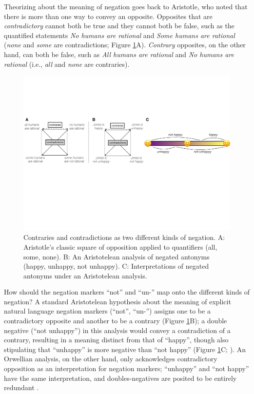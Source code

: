 \documentclass[floatsintext,doc]{apa6}
\begin{document}
Theorizing about the meaning of negation goes back to Aristotle, who noted that there is more than one way to convey an opposite.
Opposites that are \emph{contradictory} cannot both be true and they cannot both be false, such as the quantified statements \emph{No humans are rational} and \emph{Some humans are rational}  (\emph{none} and \emph{some} are contradictions; Figure \ref{fig:opp-square}A). 
\emph{Contrary} opposites, on the other hand, can both be false, such as \emph{All humans are rational} and \emph{No humans are rational} (i.e., \emph{all} and \emph{none} are contraries). 


\begin{figure}[t]
\center \includegraphics[width=1\textwidth]{figs/opp-square2}  
\caption{Contraries and contradictions as two different kinds of negation. A: Aristotle's classic square of opposition applied to quantifiers (all, some, none). B: An Aristotelean analysis of negated antonyms (happy, unhappy, not unhappy). C: Interpretations of negated antonyms under an Aristotelean analysis.}\label{fig:opp-square}
\end{figure}

How should the negation markers ``not'' and ``un-'' map onto the different kinds of negation?
A standard Aristotelean hypothesis about the meaning of explicit natural language negation markers (\enquote{not}, \enquote{un-}) assigns one to be a contradictory opposite and another to be a contrary (Figure \ref{fig:opp-square}B); a double negative (``not unhappy'') in this analysis would convey a contradiction of a contrary, resulting in a meaning distinct from that of ``happy'', though also stipulating that ``unhappy'' is more negative than ``not happy'' (Figure \ref{fig:opp-square}C; ).
An Orwellian analysis, on the other hand, only acknowledges contradictory opposition as an interpretation for negation markers; ``unhappy'' and ``not happy'' have the same interpretation, and doubles-negatives are posited to be entirely redundant \cite{orwell1946politics}.
\end{document}
